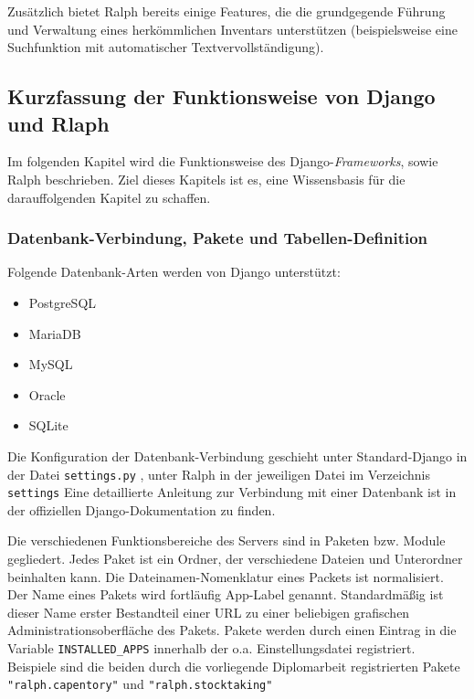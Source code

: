 Zusätzlich bietet Ralph bereits einige Features, die die grundgegende
Führung und Verwaltung eines herkömmlichen Inventars unterstützen
(beispielsweise eine Suchfunktion mit automatischer
Textvervollständigung).

\hypertarget{kurzfassung-der-funktionsweise-von-django-und-rlaph}{%
\subsection{Kurzfassung der Funktionsweise von Django und
Rlaph}\label{kurzfassung-der-funktionsweise-von-django-und-rlaph}}

Im folgenden Kapitel wird die Funktionsweise des
Django-\emph{Frameworks},
sowie Ralph beschrieben. Ziel dieses Kapitels ist es, eine Wissensbasis
für die darauffolgenden Kapitel zu schaffen.

\hypertarget{datenbank-verbindung-pakete-und-tabellen-definition}{%
\subsubsection{Datenbank-Verbindung, Pakete und
Tabellen-Definition}\label{datenbank-verbindung-pakete-und-tabellen-definition}}

Folgende Datenbank-Arten werden von Django unterstützt:

\begin{itemize}
\tightlist
\item
  PostgreSQL
\item
  MariaDB
\item
  MySQL
\item
  Oracle
\item
  SQLite
\end{itemize}

Die Konfiguration der Datenbank-Verbindung geschieht unter
Standard-Django in der Datei \texttt{settings.py} , unter Ralph in der
jeweiligen Datei im Verzeichnis \texttt{settings} Eine detaillierte
Anleitung zur Verbindung mit einer Datenbank ist in der offiziellen
Django-Dokumentation\cite{django-doku-db} zu finden.

Die verschiedenen Funktionsbereiche des Servers sind in Paketen bzw.
Module gegliedert. Jedes Paket ist ein Ordner, der verschiedene Dateien
und Unterordner beinhalten kann. Die Dateinamen-Nomenklatur eines
Packets ist normalisiert\cite{django-file-nomenklatur}. Der Name eines
Pakets wird fortläufig App-Label genannt. Standardmäßig ist dieser Name
erster Bestandteil einer URL zu einer beliebigen grafischen
Administrationsoberfläche des Pakets. Pakete werden durch einen Eintrag
in die Variable \texttt{INSTALLED\_APPS} innerhalb der o.a.
Einstellungsdatei registriert. Beispiele sind die beiden durch die
vorliegende Diplomarbeit registrierten Pakete \texttt{"ralph.capentory"}
und \texttt{"ralph.stocktaking"}

